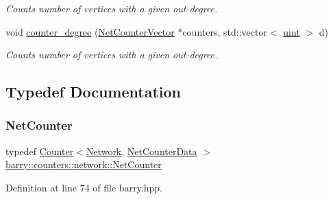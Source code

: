 \begin{Indent}
\begin{DoxyCompactItemize}
\begin{DoxyCompactList}\small\item\em Counts number of vertices with a given out-\/degree. \end{DoxyCompactList}\item 
void \hyperlink{namespacebarry_1_1counters_1_1network_a8c7ef19041094ac55a17106940c7d244}{counter\+\_\+degree} (\hyperlink{namespacebarry_1_1counters_1_1network_a3b3c590303d47840d1967372ae495d95}{Net\+Counter\+Vector} $\ast$counters, std\+::vector$<$ \hyperlink{namespacebarry_a11dfc53ddb4672278319aa04f1e09a6c}{uint} $>$ d)
\begin{DoxyCompactList}\small\item\em Counts number of vertices with a given out-\/degree. \end{DoxyCompactList}\end{DoxyCompactItemize}
\end{Indent}


\subsection{Typedef Documentation}
\mbox{\label{namespacebarry_1_1counters_1_1network_a067bd9de04608fc2e1586324d3864a45}} 
\subsubsection{\texorpdfstring{Net\+Counter}{NetCounter}}
{\footnotesize\ttfamily typedef \hyperlink{classbarry_1_1_counter}{Counter}$<$\hyperlink{namespacebarry_1_1counters_1_1network_a4cb88d4572ded3b447ea269c9cd0b2c0}{Network}, \hyperlink{classbarry_1_1counters_1_1network_1_1_net_counter_data}{Net\+Counter\+Data} $>$ \hyperlink{namespacebarry_1_1counters_1_1network_a067bd9de04608fc2e1586324d3864a45}{barry\+::counters\+::network\+::\+Net\+Counter}}



Definition at line 74 of file barry.\+hpp.

\mbox{\label{namespacebarry_1_1counters_1_1network_a3b3c590303d47840d1967372ae495d95}} 
